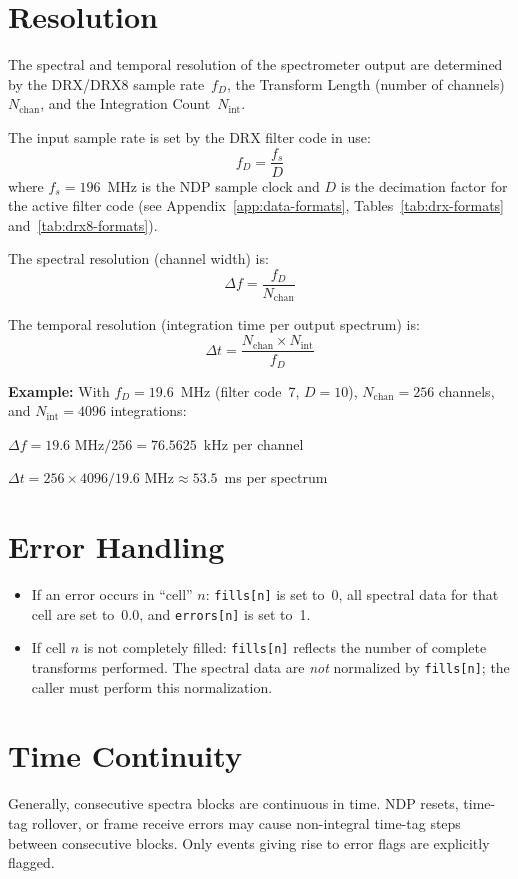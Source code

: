 \section{Resolution}

The spectral and temporal resolution of the spectrometer output are determined
by the DRX/DRX8 sample rate~$f_D$, the Transform Length (number of
channels)~$N_\text{chan}$, and the Integration Count~$N_\text{int}$.

The input sample rate is set by the DRX filter code in use:
\[
    f_D = \frac{f_s}{D}
\]
where $f_s = 196$~MHz is the NDP sample clock and $D$ is the
decimation factor for the active filter code (see
Appendix~\ref{app:data-formats}, Tables~\ref{tab:drx-formats}
and~\ref{tab:drx8-formats}).

The spectral resolution (channel width) is:
\[
    \Delta f = \frac{f_D}{N_\text{chan}}
\]

The temporal resolution (integration time per output spectrum) is:
\[
    \Delta t = \frac{N_\text{chan} \times N_\text{int}}{f_D}
\]

\begin{noteBox}
\textbf{Example:} With $f_D = 19.6$~MHz (filter code~7, $D = 10$),
$N_\text{chan} = 256$ channels, and $N_\text{int} = 4096$ integrations:

$\Delta f = 19.6\text{~MHz} / 256 = 76.5625$~kHz per channel

$\Delta t = 256 \times 4096 / 19.6\text{~MHz} \approx 53.5$~ms per spectrum
\end{noteBox}

\section{Error Handling}

\begin{itemize}
    \item If an error occurs in ``cell'' $n$: \texttt{fills[n]} is set to~0,
          all spectral data for that cell are set to~0.0, and
          \texttt{errors[n]} is set to~1.
    \item If cell $n$ is not completely filled: \texttt{fills[n]} reflects the
          number of complete transforms performed.  The spectral data are
          \emph{not} normalized by \texttt{fills[n]}; the caller must perform
          this normalization.
\end{itemize}

\section{Time Continuity}

Generally, consecutive spectra blocks are continuous in time.  NDP resets,
time-tag rollover, or frame receive errors may cause non-integral time-tag
steps between consecutive blocks.  Only events giving rise to error flags
are explicitly flagged.
